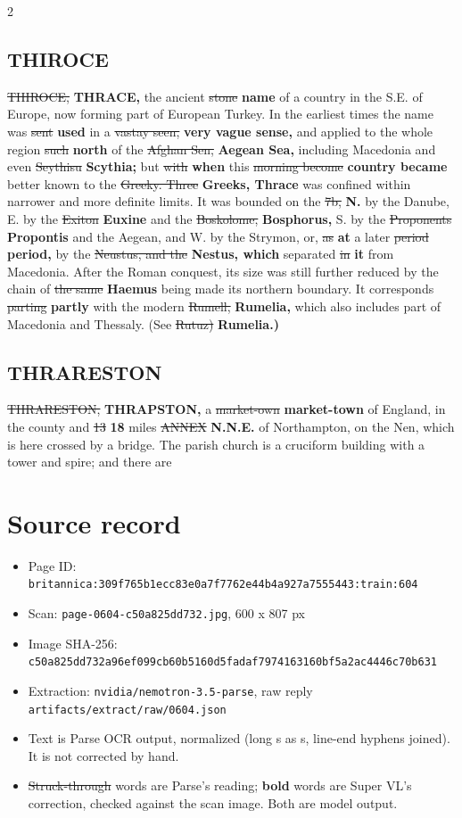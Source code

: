 \documentclass[10pt]{article}
\begin{document}
\begin{multicols}{2}
\subsection*{THIROCE}
\sout{THIROCE,} \textbf{THRACE,} the ancient \sout{stone} \textbf{name} of a country in the S.E. of Europe, now forming part of European Turkey. In the earliest times the name was \sout{sent} \textbf{used} in a \sout{vastay seen,} \textbf{very vague sense,} and applied to the whole region \sout{such} \textbf{north} of the \sout{Afghan Sen,} \textbf{Aegean Sea,} including Macedonia and even \sout{Seythisu} \textbf{Scythia;} but \sout{with} \textbf{when} this \sout{morning become} \textbf{country became} better known to the \sout{Greeky. Three} \textbf{Greeks, Thrace} was confined within narrower and more definite limits. It was bounded on the \sout{7b,} \textbf{N.} by the Danube, E. by the \sout{Exiton} \textbf{Euxine} and the \sout{Boskolome,} \textbf{Bosphorus,} S. by the \sout{Proponents} \textbf{Propontis} and the Aegean, and W. by the Strymon, or, \sout{as} \textbf{at} a later \sout{period} \textbf{period,} by the \sout{Neustus, and the} \textbf{Nestus, which} separated \sout{in} \textbf{it} from Macedonia. After the Roman conquest, its size was still further reduced by the chain of \sout{the same} \textbf{Haemus} being made its northern boundary. It corresponds \sout{parting} \textbf{partly} with the modern \sout{Rumell,} \textbf{Rumelia,} which also includes part of Macedonia and Thessaly. (See \sout{Rutuz)} \textbf{Rumelia.)}

\subsection*{THRARESTON}
\sout{THRARESTON,} \textbf{THRAPSTON,} a \sout{market-own} \textbf{market-town} of England, in the county and \sout{13} \textbf{18} miles \sout{ANNEX} \textbf{N.N.E.} of Northampton, on the Nen, which is here crossed by a bridge. The parish church is a cruciform building with a tower and spire; and there are
\end{multicols}
\section*{Source record}
\begin{itemize}
\item Page ID: \texttt{britannica:309f765b1ecc83e0a7f7762e44b4a927a7555443:train:604}
\item Scan: \texttt{page-0604-c50a825dd732.jpg}, 600 x 807 px
\item Image SHA-256: \texttt{\small c50a825dd732a96ef099cb60b5160d5fadaf7974163160bf5a2ac4446c70b631}
\item Extraction: \texttt{nvidia/nemotron-3.5-parse}, raw reply \texttt{artifacts/extract/raw/0604.json}
\item Text is Parse OCR output, normalized (long s as s, line-end hyphens joined). It is not corrected by hand.
\item \sout{Struck-through} words are Parse's reading; \textbf{bold} words are Super VL's correction, checked against the scan image. Both are model output.
\end{itemize}
\end{document}
